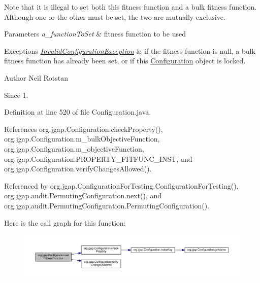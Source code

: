 Note that it is illegal to set both this fitness function and a bulk fitness function. Although one or the other must be set, the two are mutually exclusive.


\begin{DoxyParams}{Parameters}
{\em a\-\_\-function\-To\-Set} & fitness function to be used\\
\hline
\end{DoxyParams}

\begin{DoxyExceptions}{Exceptions}
{\em \hyperlink{classorg_1_1jgap_1_1_invalid_configuration_exception}{Invalid\-Configuration\-Exception}} & if the fitness function is null, a bulk fitness function has already been set, or if this \hyperlink{classorg_1_1jgap_1_1_configuration}{Configuration} object is locked.\\
\hline
\end{DoxyExceptions}
\begin{DoxyAuthor}{Author}
Neil Rotstan 
\end{DoxyAuthor}
\begin{DoxySince}{Since}
1. 
\end{DoxySince}


Definition at line 520 of file Configuration.\-java.



References org.\-jgap.\-Configuration.\-check\-Property(), org.\-jgap.\-Configuration.\-m\-\_\-bulk\-Objective\-Function, org.\-jgap.\-Configuration.\-m\-\_\-objective\-Function, org.\-jgap.\-Configuration.\-P\-R\-O\-P\-E\-R\-T\-Y\-\_\-\-F\-I\-T\-F\-U\-N\-C\-\_\-\-I\-N\-S\-T, and org.\-jgap.\-Configuration.\-verify\-Changes\-Allowed().



Referenced by org.\-jgap.\-Configuration\-For\-Testing.\-Configuration\-For\-Testing(), org.\-jgap.\-audit.\-Permuting\-Configuration.\-next(), and org.\-jgap.\-audit.\-Permuting\-Configuration.\-Permuting\-Configuration().



Here is the call graph for this function\-:
\nopagebreak
\begin{figure}[H]
\begin{center}
\leavevmode
\includegraphics[width=350pt]{classorg_1_1jgap_1_1_configuration_a338d4a2941a980eb9c55af5e3fbe69d5_cgraph}
\end{center}
\end{figure}


